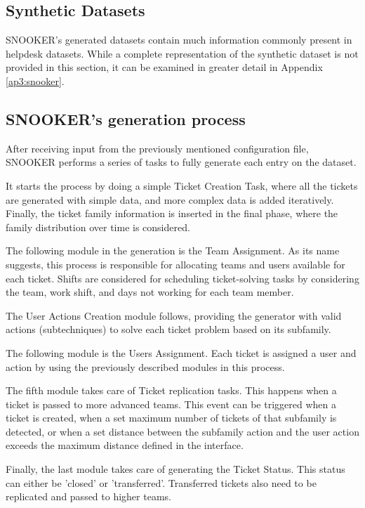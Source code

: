 \subsection{Synthetic Datasets}
SNOOKER's generated datasets contain much information commonly present in helpdesk datasets. While a complete representation of the synthetic dataset is not provided in this section, it can be examined in greater detail in Appendix \ref{ap3:snooker}.

\subsection{SNOOKER's generation process}
After receiving input from the previously mentioned configuration file, SNOOKER performs a series of tasks to fully generate each entry on the dataset. 

It starts the process by doing a simple Ticket Creation Task, where all the tickets are generated with simple data, and more complex data is added iteratively. Finally, the ticket family information is inserted in the final phase, where the family distribution over time is considered.

The following module in the generation is the Team Assignment. As its name suggests, this process is responsible for allocating teams and users available for each ticket. Shifts are considered for scheduling ticket-solving tasks by considering the team, work shift, and days not working for each team member.

The User Actions Creation module follows, providing the generator with valid actions (subtechniques) to solve each ticket problem based on its subfamily.

The following module is the Users Assignment. Each ticket is assigned a user and action by using the previously described modules in this process.

The fifth module takes care of Ticket replication tasks. This happens when a ticket is passed to more advanced teams. This event can be triggered when a ticket is created, when a set maximum number of tickets of that subfamily is detected, or when a set distance between the subfamily action and the user action exceeds the maximum distance defined in the interface.

Finally, the last module takes care of generating the Ticket Status. This status can either be 'closed' or 'transferred'. Transferred tickets also need to be replicated and passed to higher teams.

